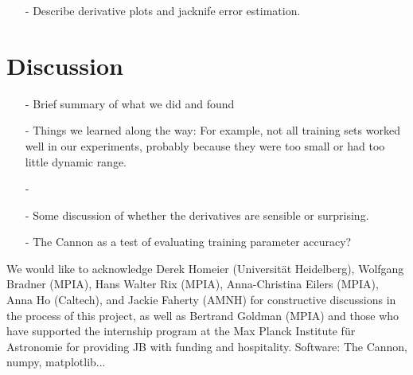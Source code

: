 \documentclass[modern]{aastex62}
\begin{document}
\begin{enumerate}
\item[-] Describe derivative plots and jacknife error estimation.
\end{enumerate}


\section{Discussion} \label{sec:discussion}

\begin{enumerate}
\item[-] Brief summary of what we did and found

\item[-] Things we learned along the way: For example, not all training sets worked well in our experiments, probably because they were too small or had too little dynamic range.

\item[-] \color{gcolor}{HOGG: Some discussion of precision and accuracy: The Cannon can produce precise results, but is only as accurate as its training set.}\color{black}

\item[-] Some discussion of whether the derivatives are sensible or surprising. \color{red}{Add derivative plots.}\color{black}

\item[-] The Cannon as a test of evaluating training parameter accuracy? 
\end{enumerate}

\acknowledgements
We would like to acknowledge Derek Homeier (Universit{\"a}t Heidelberg), Wolfgang Bradner (MPIA), Hans Walter Rix (MPIA), Anna-Christina Eilers (MPIA), Anna Ho (Caltech), and Jackie Faherty (AMNH) for constructive discussions in the process of this project, as well as Bertrand Goldman (MPIA) and those who have supported the internship program at the Max Planck Institute f{\"u}r Astronomie for providing JB with funding and hospitality. \color{red}Software: The Cannon, numpy, matplotlib... \color{black}

\color{gcolor}{HOGG: SDSS acknowledgments... Grants and stuff...}\color{black}  

\end{document}
